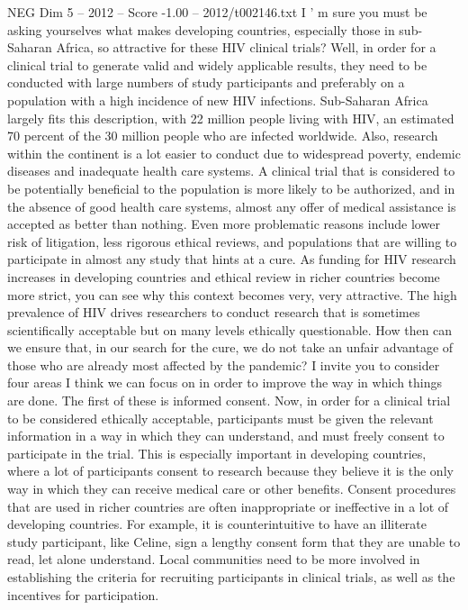 \begin{textsample}{NEG Dim 5 – 2012 – Score -1.00 – 2012/t002146.txt}
I ' m sure you must be asking yourselves what makes developing countries, especially those in sub-Saharan Africa, so attractive for these HIV clinical trials?
Well, in order for a clinical trial to generate valid and widely applicable results, they need to be conducted with large numbers of study participants and preferably on a population with a high incidence of new HIV infections.
Sub-Saharan Africa largely fits this description, with 22 million people living with HIV, an estimated 70 percent of the 30 million people who are infected worldwide.
Also, research within the continent is a lot easier to conduct due to widespread poverty, endemic diseases and inadequate health care systems.
A clinical trial that is considered to be potentially beneficial to the population is more likely to be authorized, and in the absence of good health care systems, almost any offer of medical assistance is accepted as better than nothing.
Even more problematic reasons include lower risk of litigation, less rigorous ethical reviews, and populations that are willing to participate in almost any study that hints at a cure.
As funding for HIV research increases in developing countries and ethical review in richer countries become more strict, you can see why this context becomes very, very attractive.
The high prevalence of HIV drives researchers to conduct research that is sometimes scientifically acceptable but on many levels ethically questionable.
How then can we ensure that, in our search for the cure, we do not take an unfair advantage of those who are already most affected by the pandemic?
I invite you to consider four areas I think we can focus on in order to improve the way in which things are done.
The first of these is informed consent.
Now, in order for a clinical trial to be considered ethically acceptable, participants must be given the relevant information in a way in which they can understand, and must freely consent to participate in the trial.
This is especially important in developing countries, where a lot of participants consent to research because they believe it is the only way in which they can receive medical care or other benefits.
Consent procedures that are used in richer countries are often inappropriate or ineffective in a lot of developing countries.
For example, it is counterintuitive to have an illiterate study participant, like Celine, sign a lengthy consent form that they are unable to read, let alone understand.
Local communities need to be more involved in establishing the criteria for recruiting participants in clinical trials, as well as the incentives for participation.

\end{textsample}
